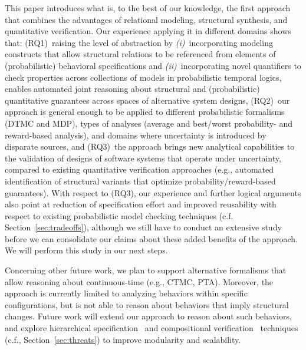 \documentclass[10pt,journal,compsoc]{IEEEtran}
\begin{document}
This paper introduces what is, to the best of our knowledge, the first approach that combines the advantages of relational modeling, structural synthesis, and quantitative verification. 
Our experience applying it in different domains shows that: (RQ1)~raising the level of abstraction by {\em (i)}~incorporating modeling constructs that allow structural relations to be referenced from elements of (probabilistic) behavioral specifications and {\em (ii)}~incorporating novel quantifiers to check properties across collections of models in probabilistic temporal logics, enables automated joint reasoning about structural and (probabilistic) quantitative guarantees across spaces of alternative system designs, (RQ2)~our approach is general enough to be applied to different probabilistic formalisms (DTMC and MDP), types of analyses (average and best/worst probability- and reward-based analysis), and domains where uncertainty is introduced by disparate sources, and (RQ3)~the approach brings new analytical capabilities to the validation of designs of software systems that operate under uncertainty, compared to existing quantitative verification approaches (e.g., automated identification of structural variants that optimize probability/reward-based guarantees). With respect to (RQ3), our experience and further logical arguments also point at reduction of specification effort and improved reusability with respect to existing probabilistic model checking techniques (c.f. Section~\ref{sec:tradeoffs}), although we still have to conduct an extensive study before we can consolidate our claims about these added benefits of the approach. We will perform this study in our next steps.

Concerning other future work, we plan to support alternative formalisms that allow reasoning about continuous-time (e.g., CTMC, PTA). Moreover, the approach is currently limited to analyzing behaviors within specific configurations, but is not able to reason about behaviors that imply structural changes. 
Future work will extend our approach to reason about such behaviors, and explore hierarchical specification~\cite{DBLP:conf/sigsoft/KangMJ16} and compositional verification~\cite{Johnson:2013:IVF:2465449.2465456} techniques (c.f., Section~\ref{sec:threats}) to improve modularity and scalability. 


\end{document}
